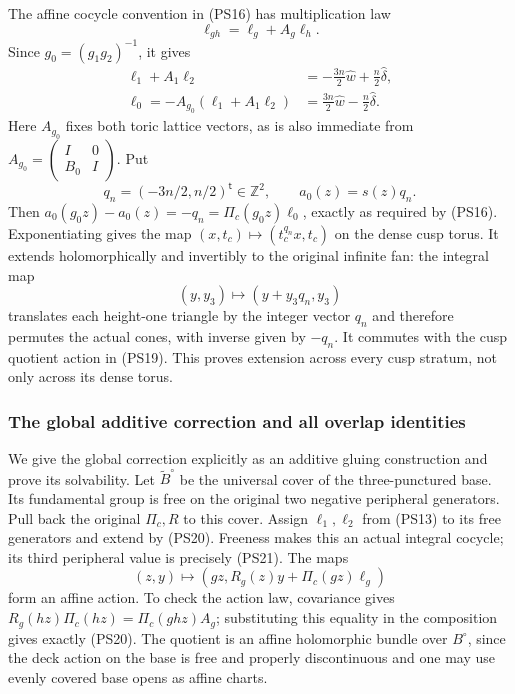 \documentclass[11pt,a4paper]{article}
\theoremstyle{plain}
\theoremstyle{definition}
\begin{document}
The affine cocycle convention in (PS16) has multiplication law
\[
                    \ell_{gh}=\ell_g+A_g\ell_h.
 \tag{PS20}\label{pshift:eq:cocycle-law}
\]
Since $g_0=(g_1g_2)^{-1}$, it gives
\[
\begin{aligned}
 \ell_1+A_1\ell_2
   &=-\frac{3n}{2}\widehat w+\frac n2\widehat\delta,\\
 \ell_0=-A_{g_0}(\ell_1+A_1\ell_2)
   &=\frac{3n}{2}\widehat w-\frac n2\widehat\delta.
\end{aligned}
\tag{PS21}\label{pshift:eq:cusp-cocycle}
\]
Here $A_{g_0}$ fixes both toric lattice vectors, as is also immediate
from $A_{g_0}=\left(\begin{smallmatrix}I&0\\B_0&I\end{smallmatrix}\right)$.
Put
\[
 q_n=(-3n/2,n/2)^{\mathsf t}\in\mathbb Z^2,
                  \qquad a_0(z)=s(z)q_n.
 \tag{PS22}\label{pshift:eq:cusp-translation}
\]
Then $a_0(g_0z)-a_0(z)=-q_n=\Pi_c(g_0z)\ell_0$, exactly as
required by (PS16). Exponentiating gives the map
$(x,t_c)\mapsto(t_c^{q_n}x,t_c)$ on the dense cusp torus.
It extends holomorphically and invertibly to the original infinite fan:
the integral map
\[
 (y,y_3)\longmapsto(y+y_3q_n,y_3)
\]
translates each height-one triangle by the integer vector $q_n$ and
therefore permutes the actual cones, with inverse given by $-q_n$.
It commutes with the cusp quotient action in (PS19). This proves
extension across every cusp stratum, not only across its dense torus.

\subsubsection{The global additive correction and all overlap identities}

We give the global correction explicitly as an additive gluing
construction and prove its solvability. Let $\widetilde B^\circ$ be
the universal cover of the three-punctured base. Its fundamental group
is free on the original two negative peripheral generators. Pull back
the original $\Pi_c,R$ to this cover. Assign $\ell_1,\ell_2$ from
(PS13) to its free generators and extend by (PS20). Freeness makes
this an actual integral cocycle; its third peripheral value is
precisely (PS21). The maps
\[
 (z,y)\longmapsto
       (gz,R_g(z)y+\Pi_c(gz)\ell_g)
 \tag{PS23}\label{pshift:eq:affine-bundle-action}
\]
form an affine action. To check the action law, covariance gives
$R_g(hz)\Pi_c(hz)=\Pi_c(ghz)A_g$; substituting this equality
in the composition gives exactly (PS20).
The quotient is an affine holomorphic bundle over $B^\circ$, since
the deck action on the base is free and properly discontinuous and
one may use evenly covered base opens as affine charts.
\end{document}
